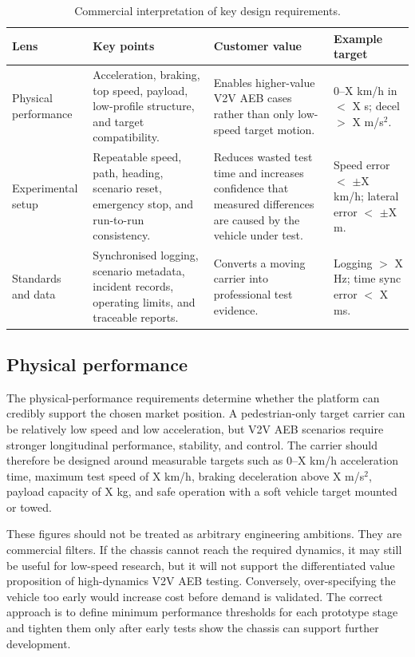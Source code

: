 \begin{table}[H]
\centering
\caption{Commercial interpretation of key design requirements.}
\label{tab:requirements_compact}
\begin{tabular}{p{} p{} p{} p{}}
\toprule
\textbf{Lens} & \textbf{Key points} & \textbf{Customer value} & \textbf{Example target} \\
\midrule
Physical performance & Acceleration, braking, top speed, payload, low-profile structure, and target compatibility. & Enables higher-value V2V AEB cases rather than only low-speed target motion. & 0--X km/h in $<$ X s; decel $>$ X m/s$^2$. \\
\midrule
Experimental setup & Repeatable speed, path, heading, scenario reset, emergency stop, and run-to-run consistency. & Reduces wasted test time and increases confidence that measured differences are caused by the vehicle under test. & Speed error $<$ $\pm$X km/h; lateral error $<$ $\pm$X m. \\
\midrule
Standards and data & Synchronised logging, scenario metadata, incident records, operating limits, and traceable reports. & Converts a moving carrier into professional test evidence. & Logging $>$ X Hz; time sync error $<$ X ms. \\
\bottomrule
\end{tabular}
\end{table}

\subsection{Physical performance}

The physical-performance requirements determine whether the platform can credibly support the chosen market position. A pedestrian-only target carrier can be relatively low speed and low acceleration, but V2V AEB scenarios require stronger longitudinal performance, stability, and control. The carrier should therefore be designed around measurable targets such as 0--X km/h acceleration time, maximum test speed of X km/h, braking deceleration above X m/s$^2$, payload capacity of X kg, and safe operation with a soft vehicle target mounted or towed.

These figures should not be treated as arbitrary engineering ambitions. They are commercial filters. If the chassis cannot reach the required dynamics, it may still be useful for low-speed research, but it will not support the differentiated value proposition of high-dynamics V2V AEB testing. Conversely, over-specifying the vehicle too early would increase cost before demand is validated. The correct approach is to define minimum performance thresholds for each prototype stage and tighten them only after early tests show the chassis can support further development.

